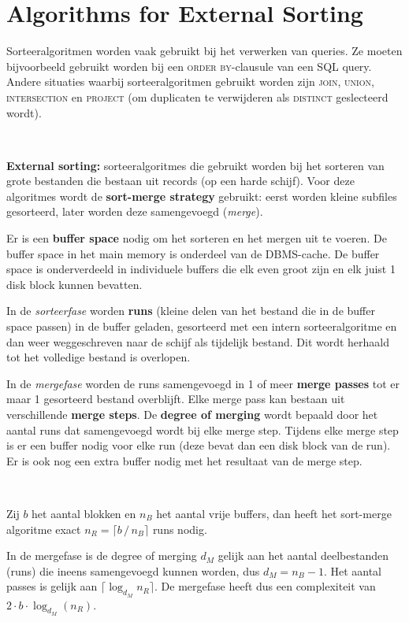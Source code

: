 \section{Algorithms for External Sorting}
Sorteeralgoritmen worden vaak gebruikt bij het verwerken van queries. Ze moeten bijvoorbeeld gebruikt worden bij een \textsc{order by}-clausule van een SQL query. Andere situaties waarbij sorteeralgoritmen gebruikt worden zijn \textsc{join}, \textsc{union}, \textsc{intersection} en \textsc{project} (om duplicaten te verwijderen als \textsc{distinct} geslecteerd wordt).

~

\noindent \textbf{External sorting:} sorteeralgoritmes die gebruikt worden bij het sorteren van grote bestanden die bestaan uit records (op een harde schijf). Voor deze algoritmes wordt de \textbf{sort-merge strategy} gebruikt: eerst worden kleine subfiles gesorteerd, later worden deze samengevoegd (\textit{merge}).

\noindent Er is een \textbf{buffer space} nodig om het sorteren en het mergen uit te voeren. De buffer space in het main memory is onderdeel van de DBMS-cache. De buffer space is onderverdeeld in individuele buffers die elk even groot zijn en elk juist 1 disk block kunnen bevatten.

In de \textit{sorteerfase} worden \textbf{runs} (kleine delen van het bestand die in de buffer space passen) in de buffer geladen, gesorteerd met een intern sorteeralgoritme en dan weer weggeschreven naar de schijf als tijdelijk bestand. Dit wordt herhaald tot het volledige bestand is overlopen.

In de \textit{mergefase} worden de runs samengevoegd in 1 of meer \textbf{merge passes} tot er maar 1 gesorteerd bestand overblijft. Elke merge pass kan bestaan uit verschillende \textbf{merge steps}. De \textbf{degree of merging} wordt bepaald door het aantal runs dat samengevoegd wordt bij elke merge step. Tijdens elke merge step is er een buffer nodig voor elke run (deze bevat dan een disk block van de run). Er is ook nog een extra buffer nodig met het resultaat van de merge step.

~

\noindent Zij $b$ het aantal blokken en $n_B$ het aantal vrije buffers, dan heeft het sort-merge algoritme exact $n_R = \lceil b \,/\, n_B \rceil$ runs nodig.

In de mergefase is de degree of merging $d_M$ gelijk aan het aantal deelbestanden (runs) die ineens samengevoegd kunnen worden, dus $d_M = n_B-1$. Het aantal passes is gelijk aan $\lceil \log_{d_M} n_R \rceil$. De mergefase heeft dus een complexiteit van $2 \cdot b \cdot \log_{d_M}(n_R)$.

